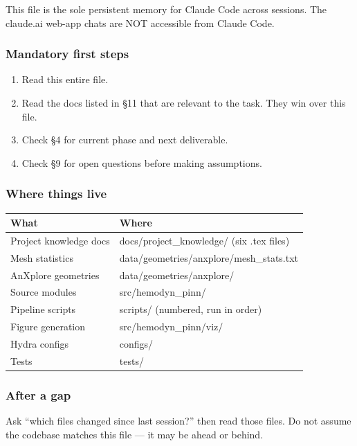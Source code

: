 \documentclass[
]{article}
\providecommand{\tightlist}{%
  \setlength{\itemsep}{0pt}\setlength{\parskip}{0pt}}
\begin{document}
This file is the sole persistent memory for Claude Code across sessions.
The claude.ai web-app chats are NOT accessible from Claude Code.

\subsubsection{Mandatory first steps}\label{mandatory-first-steps}

\begin{enumerate}
\def\labelenumi{\arabic{enumi}.}
\tightlist
\item
  Read this entire file.
\item
  Read the docs listed in §11 that are relevant to the task. They win
  over this file.
\item
  Check §4 for current phase and next deliverable.
\item
  Check §9 for open questions before making assumptions.
\end{enumerate}

\subsubsection{Where things live}\label{where-things-live}

\begin{longtable}[]{@{}ll@{}}
\toprule\noalign{}
What & Where \\
\midrule\noalign{}
\endhead
\bottomrule\noalign{}
\endlastfoot
Project knowledge docs & docs/project\_knowledge/ (six .tex files) \\
Mesh statistics & data/geometries/anxplore/mesh\_stats.txt \\
AnXplore geometries & data/geometries/anxplore/ \\
Source modules & src/hemodyn\_pinn/ \\
Pipeline scripts & scripts/ (numbered, run in order) \\
Figure generation & src/hemodyn\_pinn/viz/ \\
Hydra configs & configs/ \\
Tests & tests/ \\
\end{longtable}

\subsubsection{After a gap}\label{after-a-gap}

Ask ``which files changed since last session?'' then read those files.
Do not assume the codebase matches this file --- it may be ahead or
behind.
\end{document}
